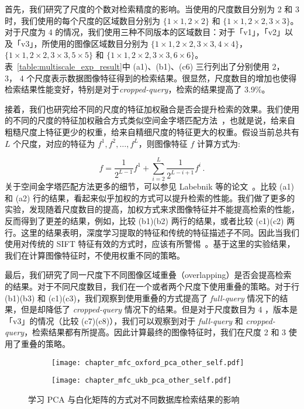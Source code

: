 首先，我们研究了尺度的个数对检索精度的影响。当使用的尺度数目分别为 2 和 3 时，我们使用的每个尺度的区域数目分别为 $\{1\times1, 2\times2\}$ 和
$\{1\times1, 2\times2, 3\times3\}$。对于尺度为 4 的情况，我们使用三种不同版本的区域数目：对于「v1」，「v2」以及「v3」，所使用的图像区域数目分别为 $\{1\times1, 2\times2, 3\times3, 4\times4\}$，$\{1\times1, 2\times2, 3\times3, 5\times5\}$ 和 $\{1\times1, 2\times2, 3\times3, 6\times6\}$。表~\ref{table:multiscale_exp_result}中 (a1)、(b1)、(c6) 三行列出了分别使用 2， 3， 4 个尺度表示数据图像特征得到的检索结果。很显然，尺度数目的增加也使得检索结果性能变好，特别是对于\emph{cropped-query}，检索的结果提高了 3.9\%。

接着，我们也研究给不同的尺度的特征加权融合是否会提升检索的效果。我们使用的不同的尺度的特征加权融合方式类似空间金字塔匹配方法~\cite{Lazebnik2006BeyondBO}，也就是说，给来自粗糙尺度上特征更少的权重，给来自精细尺度的特征更大的权重。假设当前总共有 $L$ 个尺度，对应的特征为 $f^1, f^2, \ldots, f^L$，则图像特征 $f$ 计算方式为:

\begin{equation}
f = \frac{1}{2^{L-1}}f^1 + \sum_{i=2}^{L}\frac{1}{2^{L-i+1}}f^i\, .
\end{equation}
关于空间金字塔匹配方法更多的细节，可以参见 Labebnik 等的论文~\cite{Lazebnik2006BeyondBO}。比较 (a1) 和 (a2) 行的结果，看起来似乎加权的方式可以提升检索的性能。我们做了更多的实验，发现随着尺度数目的提高，加权方式来求图像特征并不能提高检索的性能，反而得到了更差的结果，例如，比较 (b1)(b2) 两行的结果，或者比较 (c1)(c2) 两行。这里的结果表明，深度学习提取的特征和传统的特征描述子不同。因此当我们使用对传统的 SIFT 特征有效的方式时，应该有所警惕~\cite{Babenko2015AggregatingLD}。基于这里的实验结果，我们在计算图像特征时，不使用权重不同的策略。

最后，我们研究了同一尺度下不同图像区域重叠（overlapping）是否会提高检索的结果。对于不同尺度数目，我们在一个或者两个尺度下使用重叠的策略。对于行 (b1)(b3) 和 (c1)(c3)，我们观察到使用重叠的方式提高了 \emph{full-query} 情况下的结果，但是却降低了 \emph{cropped-query} 情况下的结果。但是对于尺度数目为 4 ，版本是「v3」的情况（比较 (c7)(c8)），我们可以观察到对于 \emph{full-query} 和 \emph{cropped-query}，检索结果都有所提高。因此计算最终的图像特征时，我们在尺度 2 和 3 使用了重叠的策略。


\begin{figure}[!t]
	\centering
	\begin{subfigure}{.5\columnwidth}
		\centering
		\texttt{[image: chapter\_mfc\_oxford\_pca\_other\_self.pdf]}
	\end{subfigure}%
	\hfill
	\begin{subfigure}{.5\columnwidth}
		\centering
		\texttt{[image: chapter\_mfc\_ukb\_pca\_other\_self.pdf]}
	\end{subfigure}
	\caption{学习 PCA 与白化矩阵的方式对不同数据库检索结果的影响}
	\label{fig:pca_self_other_exp}
\end{figure}

